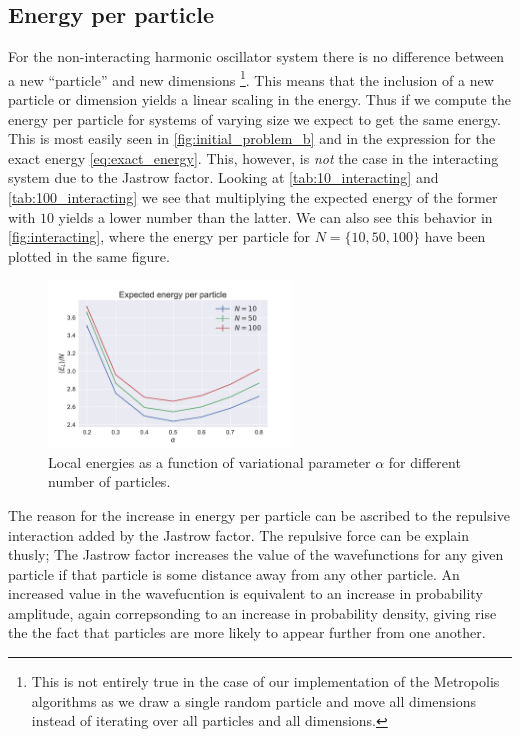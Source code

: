 \documentclass[
    a4paper, aps, twocolumn, floatfix, superscriptaddress,
    nofootinbib]{revtex4-1}
\newcommand{\1}{\mathds{1}}
\begin{document}
    \subsection{Energy per particle}
        For the non-interacting harmonic oscillator system there is no
        difference between a new ``particle'' and new dimensions
        \footnote{This is not entirely true in the case of our implementation of
        the Metropolis algorithms as we draw a single random particle and move
        all dimensions instead of iterating over all particles and all
        dimensions.}. This means that the inclusion of a new particle or
        dimension yields a linear scaling in the energy. Thus if we compute the
        energy per particle for systems of varying size we expect to get the
        same energy. This is most easily seen in \autoref{fig:initial_problem_b}
        and in the expression for the exact energy \autoref{eq:exact_energy}.
        This, however, is \emph{not} the case in the interacting system due to
        the Jastrow factor. Looking at \autoref{tab:10_interacting} and
        \autoref{tab:100_interacting} we see that multiplying the expected
        energy of the former with $10$ yields a lower number than the latter. We
        can also see this behavior in \autoref{fig:interacting}, where the
        energy per particle for $N = \{10, 50, 100\}$ have been plotted in the
        same figure.

        \begin{figure}
            \includegraphics[width=244px]{../data/figures/problem_e.pdf}
            \caption{Local energies as a function of variational parameter
            $\alpha$ for different number of particles.}
            \label{fig:interacting}
        \end{figure}

        The reason for the increase in energy per particle can be ascribed to the
        repulsive interaction added by the Jastrow factor. The repulsive force can
        be explain thusly; The Jastrow factor  increases the value of the
        wavefunctions for any given particle if that particle is some distance away
         from any other particle. An increased value in the wavefucntion is equivalent
         to an increase in probability amplitude, again correpsonding to an increase in
         probability density, giving rise the the fact that particles are more likely to
         appear further from one another.
\end{document}
